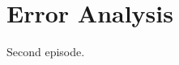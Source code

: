 \documentclass[11pt]{article}
\begin{document}
\section{Error Analysis}

Second episode.


%
%   
%
%
%
\end{document}
